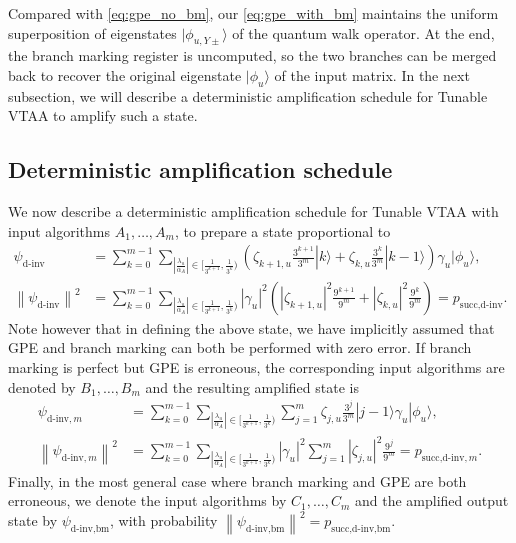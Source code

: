 \documentclass[letterpaper,onecolumn,11pt,accepted=2026-02-14]{quantumarticle}
\newcommand{\abs}[1]{\left\lvert#1\right\rvert}
\newcommand{\norm}[1]{\left\lVert#1\right\rVert}
\theoremstyle{remark}
\theoremstyle{plain}
\newcommand{\eq}[1]{\cref{eq:#1}}
\newcommand{\ket}[1]{|#1\rangle}
\begin{document}
Compared with \eq{gpe_no_bm}, our \eq{gpe_with_bm} maintains the uniform superposition of eigenstates $\ket{\phi_{u,Y\pm}}$ of the quantum walk operator. At the end, the branch marking register is uncomputed, so the two branches can be merged back to recover the original eigenstate $\ket{\phi_u}$ of the input matrix.
In the next subsection, we will describe a deterministic amplification schedule for Tunable VTAA to amplify such a state.

\subsection{Deterministic amplification schedule}
\label{sec:dinv_deterministic}
We now describe a deterministic amplification schedule for Tunable VTAA with input algorithms $A_1,\ldots,A_m$, to prepare a state proportional to
\begin{equation}
\begin{aligned}
    \psi_{\text{d-inv}}&=
    \sum_{k=0}^{m-1}\sum_{\abs{\frac{\lambda_u}{\alpha_A}}\in\big[\frac{1}{3^{k+1}},\frac{1}{3^k}\big)}
    \left(\zeta_{k+1,u}\frac{3^{k+1}}{3^m}\ket{k}+\zeta_{k,u}\frac{3^k}{3^m}\ket{k-1}\right)\gamma_u\ket{\phi_u},\\
    \norm{\psi_{\text{d-inv}}}^2&=\sum_{k=0}^{m-1}\sum_{\abs{\frac{\lambda_u}{\alpha_A}}\in\big[\frac{1}{3^{k+1}},\frac{1}{3^k}\big)}\abs{\gamma_u}^2\left(\abs{\zeta_{k+1,u}}^2\frac{9^{k+1}}{9^m}
    +\abs{\zeta_{k,u}}^2\frac{9^k}{9^m}\right)
    =p_{\text{succ,d-inv}}.
\end{aligned}
\end{equation}
Note however that in defining the above state, we have implicitly assumed that GPE and branch marking can both be performed with zero error. If branch marking is perfect but GPE is erroneous, the corresponding input algorithms are denoted by $B_1,\ldots,B_m$ and the resulting amplified state is
\begin{equation*}
\begin{aligned}
        \psi_{\text{d-inv},m}&=
    \sum_{k=0}^{m-1}\sum_{\abs{\frac{\lambda_u}{\alpha_A}}\in\big[\frac{1}{3^{k+1}},\frac{1}{3^k}\big)}
    \sum_{j=1}^{m}
    \zeta_{j,u}\frac{3^{j}}{3^m}
    \ket{j-1}
    \gamma_u\ket{\phi_u},\\
    \norm{\psi_{\text{d-inv},m}}^2&=
    \sum_{k=0}^{m-1}\sum_{\abs{\frac{\lambda_u}{\alpha_A}}\in\big[\frac{1}{3^{k+1}},\frac{1}{3^k}\big)}
    \abs{\gamma_u}^2\sum_{j=1}^{m}\abs{\zeta_{j,u}}^2\frac{9^{j}}{9^m}=p_{\text{succ,d-inv},m}.
\end{aligned}
\end{equation*}
Finally, in the most general case where branch marking and GPE are both erroneous, we denote the input algorithms by $C_1,\ldots,C_m$ and the amplified output state by $\psi_{\text{d-inv,bm}}$, with probability $\norm{\psi_{\text{d-inv,bm}}}^2=p_{\text{succ,d-inv,bm}}$.
\end{document}
